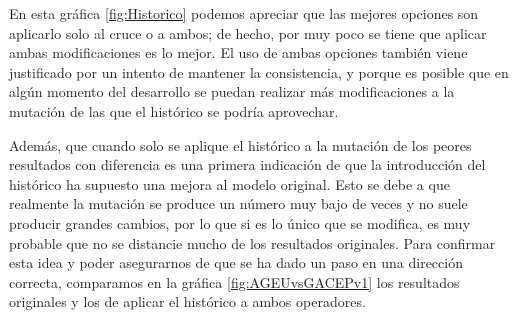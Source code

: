 En esta gráfica \ref{fig:Historico} podemos apreciar que las mejores opciones son aplicarlo solo al cruce o a ambos; de hecho, por muy poco se tiene que aplicar ambas modificaciones es lo mejor. 
El uso de ambas opciones también viene justificado por un intento de mantener la consistencia, y porque es posible que en algún momento del desarrollo se puedan realizar más modificaciones a la mutación de las que el histórico se podría aprovechar. 

Además, que cuando solo se aplique el histórico a la mutación de los peores resultados con diferencia es una primera indicación de que la introducción del histórico ha supuesto una mejora al modelo original.
Esto se debe a que realmente la mutación se produce un número muy bajo de veces y no suele producir grandes cambios, por lo que si es lo único que se modifica, es muy probable que no se distancie mucho de los resultados originales. 
Para confirmar esta idea y poder asegurarnos de que se ha dado un paso en una dirección correcta, comparamos en la gráfica \ref{fig:AGEUvsGACEPv1} los resultados originales y los de aplicar el histórico a ambos operadores. 


